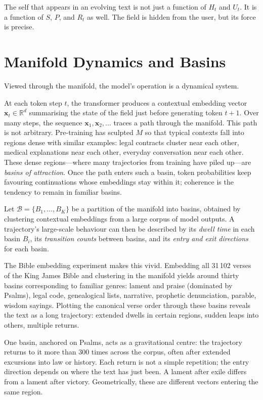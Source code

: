 \documentclass[12pt,a4paper]{article}
\begin{document}
The self that appears in an evolving text is not just a function of $H_t$ and $U_t$. It is a function of $S$, $P$, and $R_t$ as well. The field is hidden from the user, but its force is precise.

\section{Manifold Dynamics and Basins}

Viewed through the manifold, the model's operation is a dynamical system.

At each token step $t$, the transformer produces a contextual embedding vector $\mathbf{x}_t \in \mathbb{R}^d$ summarising the state of the field just before generating token $t+1$. Over many steps, the sequence $\mathbf{x}_1, \mathbf{x}_2, \dots$ traces a path through the manifold. This path is not arbitrary. Pre-training has sculpted $M$ so that typical contexts fall into regions dense with similar examples: legal contracts cluster near each other, medical explanations near each other, everyday conversation near each other. These dense regions---where many trajectories from training have piled up---are \emph{basins of attraction}. Once the path enters such a basin, token probabilities keep favouring continuations whose embeddings stay within it; coherence is the tendency to remain in familiar basins.

Let $\mathcal{B} = \{B_1, \dots, B_K\}$ be a partition of the manifold into basins, obtained by clustering contextual embeddings from a large corpus of model outputs. A trajectory's large-scale behaviour can then be described by its \emph{dwell time} in each basin $B_i$, its \emph{transition counts} between basins, and its \emph{entry and exit directions} for each basin.

The Bible embedding experiment makes this vivid. Embedding all 31\,102 verses of the King James Bible and clustering in the manifold yields around thirty basins corresponding to familiar genres: lament and praise (dominated by Psalms), legal code, genealogical lists, narrative, prophetic denunciation, parable, wisdom sayings. Plotting the canonical verse order through these basins reveals the text as a long trajectory: extended dwells in certain regions, sudden leaps into others, multiple returns.

One basin, anchored on Psalms, acts as a gravitational centre: the trajectory returns to it more than 300 times across the corpus, often after extended excursions into law or history. Each return is not a simple repetition; the entry direction depends on where the text has just been. A lament after exile differs from a lament after victory. Geometrically, these are different vectors entering the same region.
\end{document}
